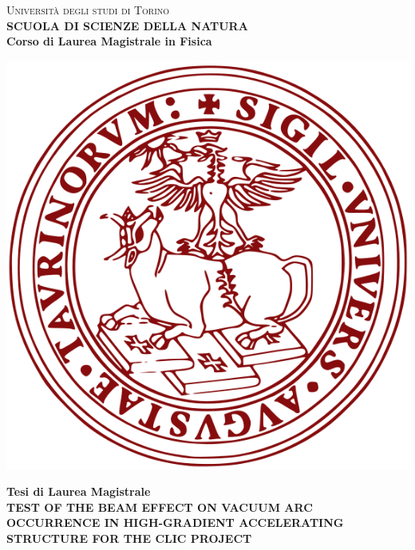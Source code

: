 \begin{titlepage}
\begin{center}
{{\Large{\textsc{Universit\`a degli studi di Torino \\}}}} \vspace{5mm} {\small{\bf SCUOLA DI SCIENZE DELLA NATURA\\ \vspace{3mm}
Corso di Laurea Magistrale in Fisica}}
\vspace{5mm}
\end{center}
\begin{center}
\includegraphics[scale=.3]{head/logo.png}
\end{center}
\begin{center}
\vspace{5mm}
{\large{\bf Tesi di Laurea Magistrale\\}}
\vspace{5mm}
{\LARGE{\bf TEST OF THE BEAM EFFECT ON VACUUM ARC OCCURRENCE IN HIGH-GRADIENT ACCELERATING STRUCTURE FOR THE CLIC PROJECT\\}}
\end{center}
\vspace{11mm}
\par

\end{titlepage}

